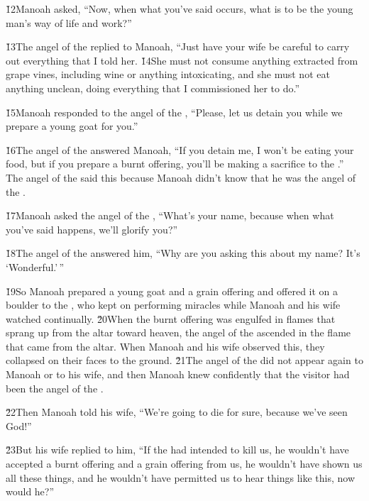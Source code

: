\v{12}Manoah asked, ``Now, when what you've said occurs, what is to be the young man's way of life and work?''

\v{13}The angel of the  replied to Manoah, ``Just have your wife be careful to carry out everything that I told her. \v{14}She must not consume anything extracted from grape vines, including wine or anything intoxicating, and she must not eat anything unclean, doing everything that I commissioned her to do.''

\v{15}Manoah responded to the angel of the , ``Please, let us detain you while we prepare a young goat for you.''

\v{16}The angel of the  answered Manoah, ``If you detain me, I won't be eating your food, but if you prepare a burnt offering, you'll be making a sacrifice to the .'' The angel of the  said this because Manoah didn't know that he was the angel of the .

\v{17}Manoah asked the angel of the , ``What's your name, because when what you've said happens, we'll glorify you?''

\v{18}The angel of the  answered him, ``Why are you asking this about my name? It's `Wonderful.'\,''

\v{19}So Manoah prepared a young goat and a grain offering and offered it on a boulder to the , who kept on performing miracles while Manoah and his wife watched continually. \v{20}When the burnt offering was engulfed in flames that sprang up from the altar toward heaven, the angel of the  ascended in the flame that came from the altar. When Manoah and his wife observed this, they collapsed on their faces to the ground. \v{21}The angel of the  did not appear again to Manoah or to his wife, and then Manoah knew confidently that the visitor had been the angel of the .

\v{22}Then Manoah told his wife, ``We're going to die for sure, because we've seen God!''

\v{23}But his wife replied to him, ``If the  had intended to kill us, he wouldn't have accepted a burnt offering and a grain offering from us, he wouldn't have shown us all these things, and he wouldn't have permitted us to hear things like this, now would he?''

